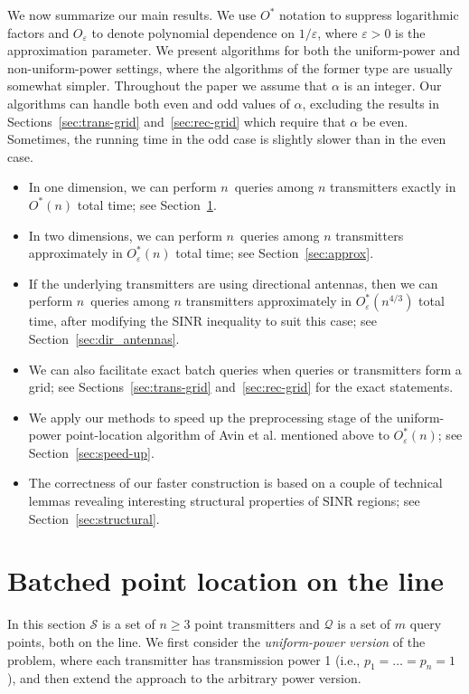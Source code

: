 \documentclass[11pt]{article}
\theoremstyle{remark}
\def\Q{\mathcal{Q}}
\def\S{\mathcal{S}}
\let\eps\varepsilon
\begin{document}
We now summarize our main results.
We use $O^*$ notation to suppress logarithmic factors and $O_\eps$ to denote polynomial dependence on $1/\eps$, where $\eps>0$ is the approximation parameter.  We present algorithms for both the uniform-power and non-uniform-power settings, where the algorithms of the former type are usually somewhat simpler.
Throughout the paper we assume that $\alpha$ is an integer. Our algorithms can handle both even and odd values of $\alpha$, excluding the results in Sections~\ref{sec:trans-grid} and~\ref{sec:rec-grid} which require that $\alpha$ be even. Sometimes, the running time in the odd case is slightly slower than in the even case.
\begin{itemize}
\item In one dimension, we can perform $n$~queries among $n$ transmitters exactly in $O^*(n)$ total time; see Section~\ref{sec:1d}.
\item In two dimensions, we can perform $n$~queries among $n$ transmitters approximately in $O^*_\eps(n)$ total time; see Section~\ref{sec:approx}. 
\item If the underlying transmitters are using directional antennas, then we can perform $n$~queries among $n$ transmitters approximately in $O^*_\eps(n^{4/3})$ total time, after modifying the SINR inequality to suit this case; see Section~\ref{sec:dir_antennas}.
\item We can also facilitate exact batch queries when queries or transmitters form a grid; see Sections~\ref{sec:trans-grid} and~\ref{sec:rec-grid} for the exact statements.
\item
We apply our methods to speed up the preprocessing stage of the uniform-power point-location algorithm of Avin et al. \cite{aeklpr-sdciawn-12} mentioned above to $O^*_\eps(n)$; see Section~\ref{sec:speed-up}.
\item
The correctness of our faster construction is based on a couple of technical lemmas revealing interesting structural properties of SINR regions; see Section~\ref{sec:structural}.  
\end{itemize}







\section{Batched point location on the line}
\label{sec:1d}

In this section $\S$ is a set of $n\geq3$ point transmitters and $\Q$ is a set of $m$ query points, both on the line.
We first consider the \emph{uniform-power version} of the problem, where each transmitter has transmission power 1 (i.e., $p_1=\dots=p_n=1$), and then extend the approach to the arbitrary power version. 
\end{document}
